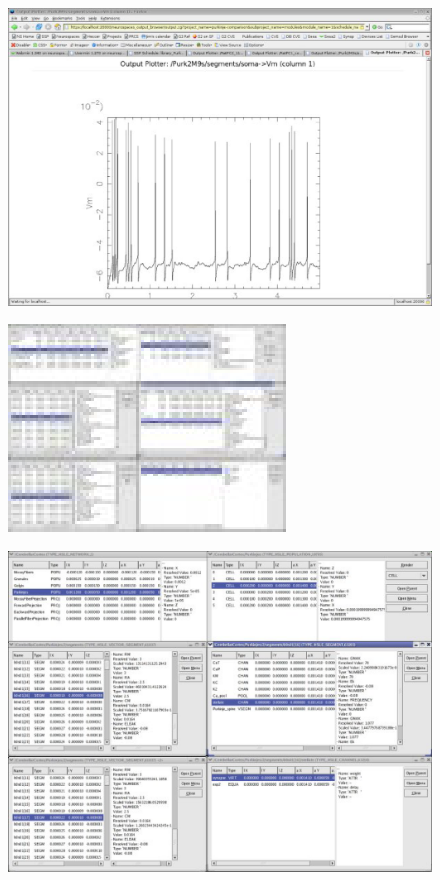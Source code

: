 \documentclass[12pt]{article}
\begin{document}
\begin{figure}[h]
  \centering
 \includegraphics[scale=0.6]{figures/screenshot-4.eps}
  \label{fig:pb-1}
\end{figure}

\begin{figure}[h]
  \centering
 \includegraphics[scale=0.6]{figures/screenshot-5.eps}
  \label{fig:pb-1}
\end{figure}

\begin{figure}[h]
  \centering
 \includegraphics[scale=0.6]{figures/screenshot-6.eps}
  \label{fig:pb-1}
\end{figure}
\end{document}
